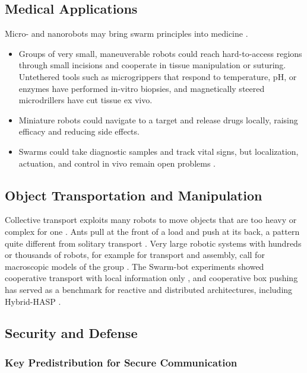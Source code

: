 \subsection{Medical Applications}

Micro- and nanorobots may bring swarm principles into medicine
\cite{bhowmick2024bio}.
\begin{itemize}
  \item {} Groups of very small, maneuverable robots
        could reach hard-to-access regions through small incisions and cooperate
        in tissue manipulation or suturing. Untethered tools such as microgrippers
        that respond to temperature, pH, or enzymes have performed in-vitro
        biopsies, and magnetically steered microdrillers have cut tissue ex vivo.
  \item {} Miniature robots could navigate to a target
        and release drugs locally, raising efficacy and reducing side effects.
  \item {} Swarms could take diagnostic samples and
        track vital signs, but localization, actuation, and control in vivo remain
        open problems \cite{bhowmick2024bio}.
\end{itemize}

\subsection{Object Transportation and Manipulation}

Collective transport exploits many robots to move objects that are too heavy or
complex for one \cite{brambilla2013swarm}. Ants pull at the front of a load and
push at its back, a pattern quite different from solitary transport
\cite{bonabeau1999swarm}. Very large robotic systems with hundreds or thousands
of robots, for example for transport and assembly, call for macroscopic models of
the group \cite{reif1999social}. The Swarm-bot experiments showed cooperative
transport with local information only \cite{mondada2003swarmbot,gross2006object},
and cooperative box pushing has served as a benchmark for reactive and
distributed architectures, including Hybrid-HASP \cite{tan2016handbook}.

\subsection{Security and Defense}

\subsubsection{Key Predistribution for Secure Communication}

